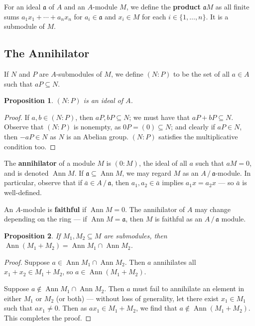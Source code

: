 \documentclass[11pt]{article}
\newtheorem{proposition}{Proposition}
\newcommand{\Ann}{\operatorname{Ann}}
\begin{document}
For an ideal $\mathfrak{a}$ of $A$ and an $A$-module $M$, we define the \textbf{product} $\mathfrak{a} M$ as all finite sums $a_{1}x_{1} + \cdots + a_{n}x_{n}$ for $a_{i} \in \mathfrak{a}$ and $x_{i} \in M$  for each $i \in \{ 1, \ldots, n \}$. It is a submodule of $M$.


\subsection{The Annihilator}

If $N$ and $P$ are $A$-submodules of $M$, we define $(N : P)$ to be the set of all $a \in A$ such that $aP \subseteq N$.

\newpage

\begin{adjustwidth}{0.5cm}{}
	\begin{proposition}
		$(N : P)$ is an ideal of $A$.
	\end{proposition}
	\begin{proof}
		If $a, b \in (N : P)$, then $aP, bP \subseteq N$; we must have that $aP + bP \subseteq N$. Observe that $(N : P)$ is nonempty, as $0P = (0) \subseteq N$; and clearly if $aP \in N$, then $-aP \in N$ as $N$ is an Abelian group. $(N : P)$ satisfies the multiplicative condition too.
	\end{proof}
\end{adjustwidth}

The \textbf{annihilator} of a module $M$ is $(0 : M)$, the ideal of all $a$ such that $aM = 0$, and is denoted $\Ann M$. If $\mathfrak{a} \subseteq \Ann M$, we may regard $M$ as an $A \, / \, \mathfrak{a}$-module. In particular, observe that if $\bar{a} \in A \, / \, \mathfrak{a}$, then $a_{1}, a_{2} \in \bar{a}$ implies $a_{1}x = a_{2}x$ --- so $\bar{a}$ is well-defined.

An $A$-module is \textbf{faithful} if $\Ann M = 0$. The annihilator of $A$ may change depending on the ring --- if $\Ann M = \mathfrak{a}$, then $M$ is faithful as an $A \, / \, \mathfrak{a}$ module.

\begin{adjustwidth}{0.5cm}{}
	\begin{proposition}
		If $M_{1}, M_{2} \subseteq M$ are submodules, then $\Ann(M_{1} + M_{2}) = \Ann M_{1} \cap \Ann M_{2}$.
	\end{proposition}
	\begin{proof}
		Suppose $a \in \Ann M_{1} \cap \Ann M_{2}$. Then $a$ annihilates all $x_{1} + x_{2} \in M_{1} + M_{2}$, so $a \in \Ann(M_{1} + M_{2})$.

		Suppose $a \notin \Ann M_{1} \cap \Ann M_{2} $. Then $a$ must fail to annihilate an element in either $M_{1}$ or $M_{2}$ (or both) --- without loss of generality, let there exist $x_{1} \in M_{1}$ such that $ax_{1} \ne 0$. Then as $ax_{1} \in M_{1} + M_{2}$, we find that $a \notin \Ann(M_{1} + M_{2})$. This completes the proof.
	\end{proof}
\end{adjustwidth}
\end{document}

